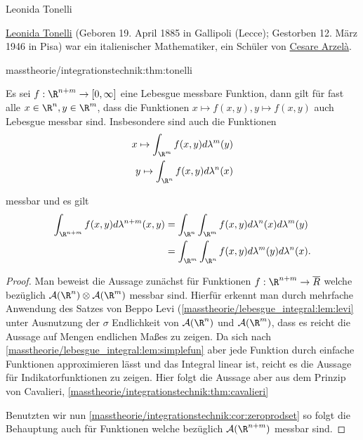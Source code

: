 \documentclass[letterpaper,10pt,german]{jupyterBook}
\begin{document}
\begin{emphBox}{Leonida Tonelli}{}

\par
\href{https://de.wikipedia.org/wiki/Leonida\_Tonelli}{Leonida Tonelli} (Geboren 19. April 1885 in Gallipoli (Lecce); Gestorben 12. März 1946 in Pisa) war ein italienischer Mathematiker, ein Schüler von \href{https://de.wikipedia.org/wiki/Cesare\_Arzel\%C3\%A0}{Cesare Arzelà}.
\end{emphBox}
\begin{theorem}{}{masstheorie/integrationstechnik:thm:tonelli}



\par
Es sei \(f:\R^{n+m}\to [0,\infty]\) eine Lebesgue messbare Funktion, dann gilt für fast alle \(x\in\R^n,y\in\R^m\), dass die Funktionen \(x\mapsto f(x,y), y\mapsto f(x,y)\) auch Lebesgue messbar sind. Insbesondere sind auch die Funktionen
\begin{align*}
x \mapsto \int_{\R^m} f(x,y) d\lambda^m(y)\\
y \mapsto \int_{\R^n} f(x,y) d\lambda^n(x)
\end{align*}
\par
messbar und es gilt
\begin{align*}
\int_{\R^{n+m}} f(x,y) d\lambda^{n+m}(x,y) &= \int_{\R^n}\int_{\R^m} f(x,y) d\lambda^{n}(x)d\lambda^m(y)\\
&=
\int_{\R^m}\int_{\R^n} f(x,y) d\lambda^{m}(y)d\lambda^n(x).
\end{align*}\end{theorem}

\begin{proof}
 Man beweist die Aussage zunächst für Funktionen \(f:\R^{n+m}\to\overline{R}\) welche bezüglich \(\mathcal{A}(\R^n)\otimes\mathcal{A}(\R^m)\) messbar sind. Hierfür erkennt man durch mehrfache Anwendung des Satzes von Beppo Levi (\cref{masstheorie/lebesgue_integral:lem:levi}  unter Ausnutzung der \(\sigma\) Endlichkeit von \(\mathcal{A}(\R^n)\) und \(\mathcal{A}(\R^m)\), dass es reicht die Aussage auf Mengen endlichen Maßes zu zeigen. Da sich nach \cref{masstheorie/lebesgue_integral:lem:simplefun} aber jede Funktion durch einfache Funktionen approximieren lässt und das Integral linear ist, reicht es die Aussage für Indikatorfunktionen zu zeigen. Hier folgt die Aussage aber aus dem Prinzip von Cavalieri, \cref{masstheorie/integrationstechnik:thm:cavalieri} 

\par
Benutzten wir nun \cref{masstheorie/integrationstechnik:cor:zeroprodset} so folgt die Behauptung auch für Funktionen welche bezüglich \(\mathcal{A}(\R^{n+m})\) messbar sind.
\end{proof}
\end{document}
